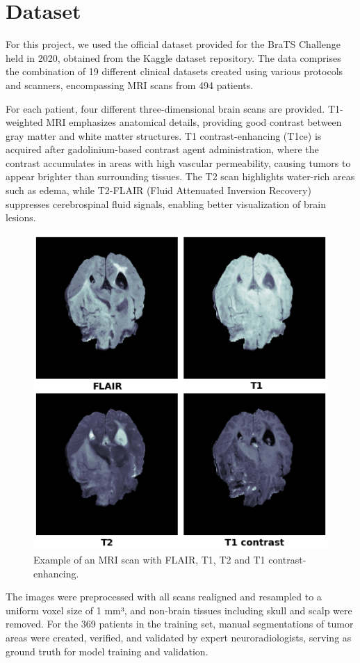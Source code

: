 \documentclass[10pt,twocolumn,letterpaper]{article}
\begin{document}

\section{Dataset}
For this project, we used the official dataset\cite{BraTSdataset} provided for the BraTS Challenge held in 2020, obtained from the Kaggle dataset repository. The data comprises the combination of 19 different clinical datasets created using various protocols and scanners, encompassing MRI scans from 494 patients.

For each patient, four different three-dimensional brain scans are provided. T1-weighted MRI emphasizes anatomical details, providing good contrast between gray matter and white matter structures. T1 contrast-enhancing (T1ce) is acquired after gadolinium-based contrast agent administration, where the contrast accumulates in areas with high vascular permeability, causing tumors to appear brighter than surrounding tissues. The T2 scan highlights water-rich areas such as edema, while T2-FLAIR (Fluid Attenuated Inversion Recovery) suppresses cerebrospinal fluid signals, enabling better visualization of brain lesions.

\begin{figure}[H]
\centering
\includegraphics[width=0.55\linewidth]{img/example_MRI.png}
\caption{Example of an MRI scan with FLAIR, T1, T2 and T1 contrast-enhancing.}
\end{figure}

The images were preprocessed with all scans realigned and resampled to a uniform voxel size of 1 mm³, and non-brain tissues including skull and scalp were removed. For the 369 patients in the training set, manual segmentations of tumor areas were created, verified, and validated by expert neuroradiologists, serving as ground truth for model training and validation.
\end{document}
